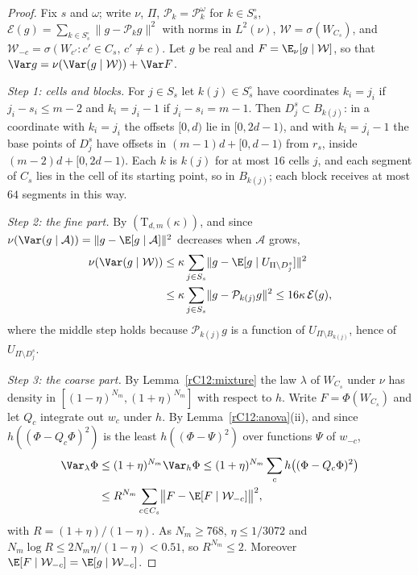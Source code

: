 \begin{proof}
Fix $s$ and $\omega$; write $\nu$, $\Pi$, $\mathcal P_k=\mathcal P^\omega_k$
for $k\in S^\circ_s$, $\mathcal E(g)=\sum_{k\in S^\circ_s}\lVert g-\mathcal
P_kg\rVert^2$ with norms in $L^2(\nu)$, $\mathcal W=\sigma(W_{C_s})$, and
$\mathcal W_{-c}=\sigma(W_{c'}:c'\in C_s,\,c'\ne c)$. Let $g$ be real and
$F=\E_\nu[g\mid\mathcal W]$, so that $\Var g=\nu(\Var(g\mid\mathcal W))+
\Var F$.

\emph{Step 1: cells and blocks.} For $j\in S_s$ let $k(j)\in S^\circ_s$ have
coordinates $k_i=j_i$ if $j_i-s_i\le m-2$ and $k_i=j_i-1$ if $j_i-s_i=m-1$.
Then $D^s_j\subset B_{k(j)}$: in a coordinate with $k_i=j_i$ the offsets
$[0,d)$ lie in $[0,2d-1)$, and with $k_i=j_i-1$ the base points of $D^s_j$
have offsets in $(m-1)d+[0,d-1)$ from $r_s$, inside $(m-2)d+[0,2d-1)$. Each
$k$ is $k(j)$ for at most $16$ cells $j$, and each segment of $C_s$ lies in
the cell of its starting point, so in $B_{k(j)}$; each block receives at
most $64$ segments in this way.

\emph{Step 2: the fine part.} By $(\mathrm T_{d,m}(\kappa))$, and since
$\nu(\Var(g\mid\mathcal A))=\lVert g-\E[g\mid\mathcal A]\rVert^2$ decreases
when $\mathcal A$ grows,
\[
\begin{split}
\nu(\Var(g\mid\mathcal W))&\le\kappa\sum_{j\in S_s}\lVert g-\E[g\mid
U_{\Pi\setminus D^s_j}]\rVert^2\\
&\le\kappa\sum_{j\in S_s}\lVert g-\mathcal
P_{k(j)}g\rVert^2\le16\kappa\,\mathcal E(g),
\end{split}
\]
where the middle step holds because $\mathcal P_{k(j)}g$ is a function of
$U_{\Pi\setminus B_{k(j)}}$, hence of $U_{\Pi\setminus D^s_j}$.

\emph{Step 3: the coarse part.} By Lemma~\ref{rC12:mixture} the law
$\lambda$ of $W_{C_s}$ under $\nu$ has density in $[(1-\eta)^{N_m},
(1+\eta)^{N_m}]$ with respect to $h$. Write $F=\Phi(W_{C_s})$ and let
$Q_c$ integrate out $w_c$ under $h$. By Lemma~\ref{rC12:anova}(ii), and
since $h((\Phi-Q_c\Phi)^2)$ is the least $h((\Phi-\Psi)^2)$ over functions
$\Psi$ of $w_{-c}$,
\[
\begin{split}
\Var_\lambda\Phi&\le(1+\eta)^{N_m}\Var_h\Phi\le(1+\eta)^{N_m}\sum_ch\bigl(
(\Phi-Q_c\Phi)^2\bigr)\\
&\le R^{N_m}\sum_{c\in C_s}\bigl\lVert F-\E[F\mid
\mathcal W_{-c}]\bigr\rVert^2,
\end{split}
\]
with $R=(1+\eta)/(1-\eta)$. As $N_m\ge768$, $\eta\le1/3072$ and $N_m\log R
\le2N_m\eta/(1-\eta)<0.51$, so $R^{N_m}\le2$. Moreover $\E[F\mid\mathcal
W_{-c}]=\E[g\mid\mathcal W_{-c}]$.


\end{proof}
